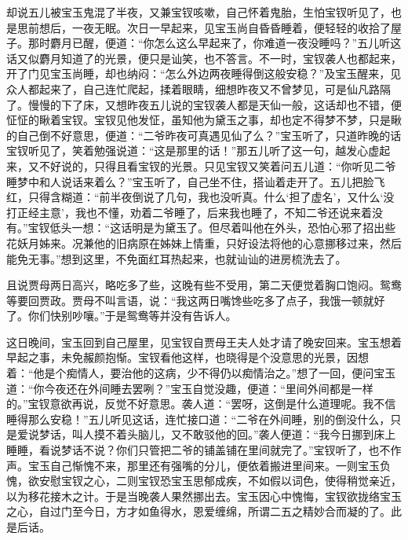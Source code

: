 \begin{parag}
    却说五儿被宝玉鬼混了半夜，又兼宝钗咳嗽，自己怀着鬼胎，生怕宝钗听见了，也是思前想后，一夜无眠。次日一早起来，见宝玉尚自昏昏睡着，便轻轻的收拾了屋子。那时麝月已醒，便道：“你怎么这么早起来了，你难道一夜没睡吗？”五儿听这话又似麝月知道了的光景，便只是讪笑，也不答言。不一时，宝钗袭人也都起来，开了门见宝玉尚睡，却也纳闷：“怎么外边两夜睡得倒这般安稳？”及宝玉醒来，见众人都起来了，自己连忙爬起，揉着眼睛，细想昨夜又不曾梦见，可是仙凡路隔了。慢慢的下了床，又想昨夜五儿说的宝钗袭人都是天仙一般，这话却也不错，便怔怔的瞅着宝钗。宝钗见他发怔，虽知他为黛玉之事，却也定不得梦不梦，只是瞅的自己倒不好意思，便道：“二爷昨夜可真遇见仙了么？”宝玉听了，只道昨晚的话宝钗听见了，笑着勉强说道：“这是那里的话！”那五儿听了这一句，越发心虚起来，又不好说的，只得且看宝钗的光景。只见宝钗又笑着问五儿道：“你听见二爷睡梦中和人说话来着么？”宝玉听了，自己坐不住，搭讪着走开了。五儿把脸飞红，只得含糊道：“前半夜倒说了几句，我也没听真。什么‘担了虚名’，又什么‘没打正经主意’，我也不懂，劝着二爷睡了，后来我也睡了，不知二爷还说来着没有。”宝钗低头一想：“这话明是为黛玉了。但尽着叫他在外头，恐怕心邪了招出些花妖月姊来。况兼他的旧病原在姊妹上情重，只好设法将他的心意挪移过来，然后能免无事。”想到这里，不免面红耳热起来，也就讪讪的进房梳洗去了。
\end{parag}


\begin{parag}
    且说贾母两日高兴，略吃多了些，这晚有些不受用，第二天便觉着胸口饱闷。鸳鸯等要回贾政。贾母不叫言语，说：“我这两日嘴馋些吃多了点子，我饿一顿就好了。你们快别吵嚷。”于是鸳鸯等并没有告诉人。
\end{parag}


\begin{parag}
    这日晚间，宝玉回到自己屋里，见宝钗自贾母王夫人处才请了晚安回来。宝玉想着早起之事，未免赧颜抱惭。宝钗看他这样，也晓得是个没意思的光景，因想着：“他是个痴情人，要治他的这病，少不得仍以痴情治之。”想了一回，便问宝玉道：“你今夜还在外间睡去罢咧？”宝玉自觉没趣，便道：“里间外间都是一样的。”宝钗意欲再说，反觉不好意思。袭人道：“罢呀，这倒是什么道理呢。我不信睡得那么安稳！”五儿听见这话，连忙接口道：“二爷在外间睡，别的倒没什么，只是爱说梦话，叫人摸不着头脑儿，又不敢驳他的回。”袭人便道：“我今日挪到床上睡睡，看说梦话不说？你们只管把二爷的铺盖铺在里间就完了。”宝钗听了，也不作声。宝玉自己惭愧不来，那里还有强嘴的分儿，便依着搬进里间来。一则宝玉负愧，欲安慰宝钗之心，二则宝钗恐宝玉思郁成疾，不如假以词色，使得稍觉亲近，以为移花接木之计。于是当晚袭人果然挪出去。宝玉因心中愧悔，宝钗欲拢络宝玉之心，自过门至今日，方才如鱼得水，恩爱缠绵，所谓二五之精妙合而凝的了。此是后话。
\end{parag}


